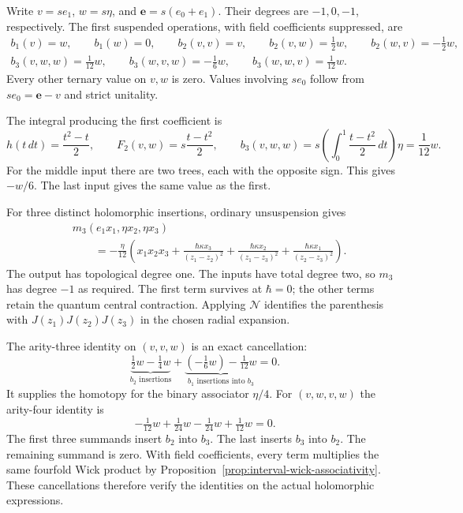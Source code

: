 Write $v=se_1$, $w=s\eta$, and $\mathbf e=s(e_0+e_1)$.
Their degrees are $-1,0,-1$, respectively.  The first suspended
operations, with field coefficients suppressed, are
\[
 \begin{gathered}
 b_1(v)=w,\qquad b_1(w)=0,\qquad
 b_2(v,v)=v,\qquad b_2(v,w)=\tfrac12w,
 \qquad b_2(w,v)=-\tfrac12w,\\
 b_3(v,w,w)=\tfrac1{12}w,\qquad
 b_3(w,v,w)=-\tfrac16w,\qquad
 b_3(w,w,v)=\tfrac1{12}w.
 \end{gathered}
\]
Every other ternary value on $v,w$ is zero.  Values involving $se_0$
follow from $se_0=\mathbf e-v$ and strict unitality.

The integral producing the first coefficient is
\[
 h(t\,dt)=\frac{t^2-t}{2},\qquad
 F_2(v,w)=s\frac{t-t^2}{2},\qquad
 b_3(v,w,w)=s\left(\int_0^1\frac{t-t^2}{2}\,dt\right)\eta
 =\frac1{12}w.
\]
For the middle input there are two trees, each with the opposite sign.
This gives $-w/6$.  The last input gives the same value as the first.

\begin{example}
\label{ex:interval-heisenberg-m3}
For three distinct holomorphic insertions, ordinary unsuspension gives
\begin{equation*}
 \begin{split}
 &m_3(e_1x_1,\eta x_2,\eta x_3)\\
 &\qquad=-\frac{\eta}{12}
 \left(x_1x_2x_3+
 \frac{\hbar\kappa x_3}{(z_1-z_2)^2}+
 \frac{\hbar\kappa x_2}{(z_1-z_3)^2}+
 \frac{\hbar\kappa x_1}{(z_2-z_3)^2}\right).
 \end{split}
\end{equation*}
The output has topological degree one.  The inputs have total degree two,
so $m_3$ has degree $-1$ as required.  The first term survives at
$\hbar=0$; the other terms retain the quantum central contraction.
Applying $\mathcal N$ identifies the parenthesis with
$J(z_1)J(z_2)J(z_3)$ in the chosen radial expansion.
\end{example}

The arity-three identity on $(v,v,w)$ is an exact cancellation:
\[
 \underbrace{\tfrac12w-\tfrac14w}_{b_2\text{ insertions}}
 +\underbrace{(-\tfrac16w)-\tfrac1{12}w}_{b_1\text{ insertions into }b_3}
 =0.
\]
It supplies the homotopy for the binary associator $\eta/4$.
For $(v,w,v,w)$ the arity-four identity is
\[
 -\tfrac1{12}w+\tfrac1{24}w-\tfrac1{24}w+\tfrac1{12}w=0.
\]
The first three summands insert $b_2$ into $b_3$.  The last inserts
$b_3$ into $b_2$.  The remaining summand is zero.  With field
coefficients, every term multiplies the same fourfold Wick product by
Proposition~\ref{prop:interval-wick-associativity}.  These cancellations
therefore verify the identities on the actual holomorphic expressions.

